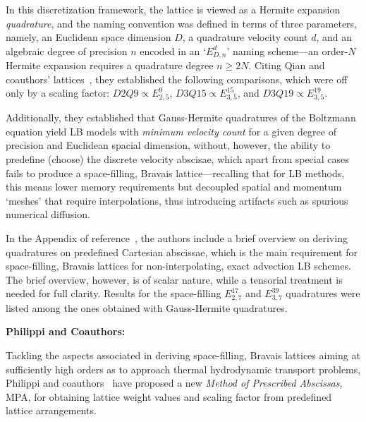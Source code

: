     In this discretization framework, the lattice is viewed as a Hermite expansion \emph{quadrature}, and the naming  convention
    was defined in terms of three parameters, namely, an Euclidean space dimension $D$, a quadrature velocity count $d$, and  an
    algebraic degree of precision $n$ encoded in an `$E_{D,n}^{d}$' naming scheme---an order-$N$ Hermite  expansion  requires  a
    quadrature degree $n \geqslant 2N$. Citing Qian  and  coauthors'  lattices~\cite{1992-QianYH+LallemandP-EuroPhysLett},  they
    established the following comparisons, which were off only by a scaling factor: $D2Q9 \propto E_{2,5}^{9}$,  $D3Q15  \propto
    E_{3,5}^{15}$, and $D3Q19 \propto E_{3,5}^{19}$.

    Additionally, they established that Gauss-Hermite quadratures of the Boltzmann equation yield LB  models  with  \emph{minimum
    velocity count} for a given degree of precision and Euclidean spacial dimension, without, however, the ability to  predefine
    (choose) the discrete velocity abscisae,  which  apart  from  special  cases  fails  to  produce  a  space-filling,  Bravais
    lattice---recalling that for LB methods, this means lower memory requirements but decoupled spatial  and  momentum  `meshes'
    that require interpolations, thus introducing artifacts such as spurious numerical diffusion.

    In the  Appendix  of  reference~\cite{2006-ShanX+ChenH-JFluidMech},  the  authors  include  a  brief  overview  on  deriving
    quadratures on predefined Cartesian abscissae, which is  the  main  requirement  for  space-filling,  Bravais  lattices  for
    non-interpolating, exact advection LB schemes. The brief overview, however, is of scalar nature, while a tensorial treatment
    is needed for full clarity. Results for the space-filling $E_{2,7}^{17}$ and $E_{3,7}^{39}$ quadratures  were  listed  among
    the ones obtained with Gauss-Hermite quadratures.



    \vspace{2.0mm}\noindent\textbf{Philippi and Coauthors:}\vspace{1.0mm}

    Tackling the aspects associated in deriving space-filling, Bravais  lattices  aiming  at  sufficiently  high  orders  as  to
    approach thermal hydrodynamic  transport  problems,  Philippi  and  coauthors~\cite{2006-PhilippiPC+SurmasR-PhysRevE}  have
    proposed a new \emph{Method of Prescribed Abscissas\/}, MPA, for obtaining lattice weight values  and  scaling  factor  from
    predefined lattice arrangements.

